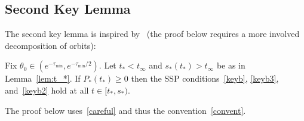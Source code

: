 \documentclass[AHL,Unicode,longabstracts,published]{cedram}
\begin{document}
\subsection{Second Key Lemma}\label{2ndl}
The second key lemma is inspired by~\cite[Lemma~3.11]{BD2} (the proof below requires a more involved decomposition of orbits):


\begin{lemm}\label{lem:short small t>}
Fix $\theta_0\in (e^{-\tau_{\min}}, e^{-\tau_{\min}/2})$. Let $t_*<t_\infty$ and $s_*(t_*)>t_\infty$ be as in Lemma~\ref{lem:t_*}. If $P_*(t_*)\ge 0$ then the SSP conditions~\eqref{keyb}, \eqref{keyb3}, and~\eqref{keyb2} hold at all $t\in [t_*, s_*)$.
\end{lemm}

The proof below uses~\eqref{careful} and thus the convention~\eqref{convent}.
\end{document}
